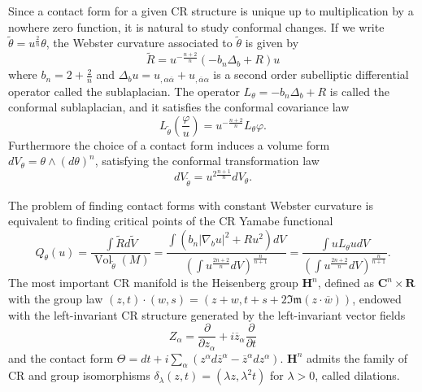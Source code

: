 \documentclass[a4paper,12pt]{amsart}
\renewcommand{\phi}{\varphi}
\newcommand{\de}{\partial}
\newcommand{\R}{\mathbf{R}}
\newcommand{\C}{\mathbf{C}}
\renewcommand{\H}{\mathbf{H}}
\newcommand{\g}[1]{\mathfrak{#1}}
\DeclareMathOperator{\Vol}{Vol}
\begin{document}
Since a contact form for a given CR structure is unique up to multiplication by a nowhere zero function, it is natural to study conformal changes. If we write $\widetilde{\theta}=u^{\frac{2}{n}}\theta$, the Webster curvature associated to $\widetilde{\theta}$ is given by
\begin{equation}\label{ConformalChangeCurvature}
 \widetilde{R} = u^{-\frac{n+2}{n}}\left(-b_n\Delta_b +R \right)u
\end{equation}
where $b_n=2+\frac{2}{n}$ and $\Delta_bu= u_{,\alpha\overline{\alpha}}+u_{,\overline{\alpha}\alpha}$ is a second order subelliptic differential operator called the sublaplacian.
The operator $L_{\theta}=-b_n\Delta_b+R$ is called the conformal sublaplacian, and it satisfies the conformal covariance law
\begin{equation}\label{TransformationSublaplacian}
L_{\widetilde{\theta}}\left(\frac{\phi}{u}\right) = u^{-\frac{n+2}{n}}L_{\theta}\phi.
\end{equation}
Furthermore the choice of a contact form induces a volume form $dV_{\theta}=\theta\wedge(d\theta)^n$, satisfying the conformal transformation law
\begin{equation}\label{TransformationVolumeForm}
dV_{\widetilde{\theta}} = u^{2\frac{n+1}{n}}dV_{\theta}.
\end{equation}

The problem of finding contact forms with constant Webster curvature is equivalent to finding critical points of the CR Yamabe functional
\begin{equation}\label{CRYamabeFunctional}
 Q_{\theta}(u) = \frac{\int\widetilde{R}d\widetilde{V}}{\Vol_{\widetilde{\theta}}(M)}=\frac{\int\left(b_n|\nabla_bu|^2+Ru^2\right)dV}{\left(\int u^{\frac{2n+2}{n}} dV\right)^{\frac{n}{n+1}}} = \frac{\int uL_{\theta}udV}{\left(\int u^{\frac{2n+2}{n}} dV\right)^{\frac{n}{n+1}}}.
\end{equation}
The most important CR manifold is the Heisenberg group $\H^n$, defined as $\C^n\times\R$ with the group law $(z,t)\cdot(w,s) = (z+w,t+s+2\g{Im}(z\cdot\overline{w}))$, endowed with the left-invariant CR structure generated by the left-invariant vector fields
$$Z_{\alpha}= \frac{\de}{\de z_{\alpha}} +i\overline{z}_{\alpha}\frac{\de}{\de t}$$
and the contact form $\Theta= dt+i\sum_{\alpha}\left( z^{\alpha}d\overline{z}^{\alpha}-\overline{z}^{\alpha}dz^{\alpha}\right)$. $\H^n$ admits the family of CR and group isomorphisms $\delta_{\lambda}(z,t)=(\lambda z,\lambda^2t)$ for $\lambda>0$, called dilations.
\end{document}
